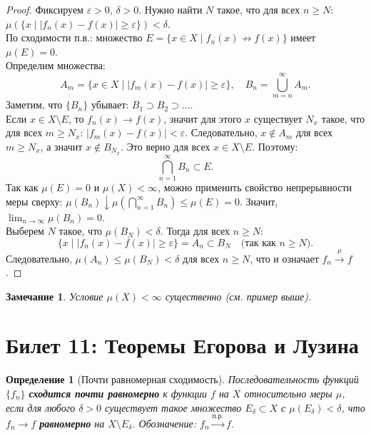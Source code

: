\documentclass[a4paper, 12pt]{article}
\newtheorem{definition}{Определение}
\newtheorem{remark}{Замечание}
\newcommand{\1}{\mathbf{1}}
\begin{document}
\begin{proof}
    Фиксируем $\varepsilon > 0$, $\delta > 0$. Нужно найти $N$ такое, что для всех $n \geq N$: $\mu(\{x \mid |f_n(x) - f(x)| \geq \varepsilon\}) < \delta$. \\
    По сходимости п.в.: множество $E = \{x \in X \mid f_n(x) \not\to f(x)\}$ имеет $\mu(E) = 0$. \\
    Определим множества:
    \[
    A_m = \{x \in X \mid |f_m(x) - f(x)| \geq \varepsilon\}, \quad B_n = \bigcup_{m=n}^{\infty} A_m.
    \]
    Заметим, что $\{B_n\}$ убывает: $B_1 \supset B_2 \supset \dots$. \\
    Если $x \in X \setminus E$, то $f_n(x) \to f(x)$, значит для этого $x$ существует $N_x$ такое, что для всех $m \geq N_x$: $|f_m(x) - f(x)| < \varepsilon$. Следовательно, $x \notin A_m$ для всех $m \geq N_x$, а значит $x \notin B_{N_x}$. Это верно для всех $x \in X \setminus E$. Поэтому:
    \[
    \bigcap_{n=1}^{\infty} B_n \subset E.
    \]
    Так как $\mu(E) = 0$ и $\mu(X) < \infty$, можно применить свойство непрерывности меры сверху: $\mu(B_n) \downarrow \mu(\bigcap_{n=1}^{\infty} B_n) \leq \mu(E) = 0$. Значит, $\lim_{n \to \infty} \mu(B_n) = 0$. \\
    Выберем $N$ такое, что $\mu(B_N) < \delta$. Тогда для всех $n \geq N$:
    \[
    \{x \mid |f_n(x) - f(x)| \geq \varepsilon\} = A_n \subset B_N \quad \text{(так как $n \geq N$)}.
    \]
    Следовательно, $\mu(A_n) \leq \mu(B_N) < \delta$ для всех $n \geq N$, что и означает $f_n \xrightarrow{\mu} f$.
\end{proof}

\begin{remark}
    Условие $\mu(X) < \infty$ существенно (см. пример выше).
\end{remark}

\section*{Билет 11: Теоремы Егорова и Лузина}
\begin{definition}[Почти равномерная сходимость]
    Последовательность функций $\{f_n\}$ \textbf{сходится почти равномерно} к функции $f$ на $X$ относительно меры $\mu$, если для любого $\delta > 0$ существует такое множество $E_\delta \subset X$ с $\mu(E_\delta) < \delta$, что $f_n \to f$ \textbf{равномерно} на $X \setminus E_\delta$. Обозначение: $f_n \xrightarrow{\text{п.р.}} f$.
\end{definition}
\end{document}
